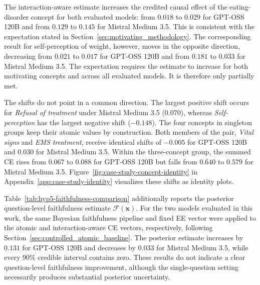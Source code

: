 The interaction-aware estimate increases the credited causal effect of the eating-disorder concept for both evaluated models: from $0.018$ to $0.029$ for GPT-OSS 120B and from $0.129$ to $0.145$ for Mistral Medium 3.5. This is consistent with the expectation stated in Section~\ref{sec:motivating_methodology}. The corresponding result for self-perception of weight, however, moves in the opposite direction, decreasing from $0.021$ to $0.017$ for GPT-OSS 120B and from $0.181$ to $0.033$ for Mistral Medium 3.5. The expectation requires the estimate to increase for both motivating concepts and across all evaluated models. It is therefore only partially met.


The shifts do not point in a common direction. The largest positive shift occurs for \textit{Refusal of treatment} under Mistral Medium 3.5 ($0.070$), whereas \textit{Self-perception} has the largest negative shift ($-0.148$). The four concepts in singleton groups keep their atomic values by construction. Both members of the pair, \textit{Vital signs} and \textit{EMS treatment}, receive identical shifts of $-0.005$ for GPT-OSS 120B and $0.030$ for Mistral Medium 3.5. Within the three-concept group, the summed CE rises from $0.067$ to $0.088$ for GPT-OSS 120B but falls from $0.640$ to $0.579$ for Mistral Medium 3.5. Figure~\ref{fig:case-study-concept-identity} in Appendix~\ref{app:case-study-identity} visualizes these shifts as identity plots.

Table~\ref{tab:hyp5-faithfulness-comparison} additionally reports the posterior question-level faithfulness estimate $\mathcal{F}(\mathbf{x})$. For the two models evaluated in this work, the same Bayesian faithfulness pipeline and fixed EE vector were applied to the atomic and interaction-aware CE vectors, respectively, following Section~\ref{sec:controlled_atomic_baseline}. The posterior estimate increases by $0.131$ for GPT-OSS 120B and decreases by $0.033$ for Mistral Medium 3.5, while every 90\% credible interval contains zero. These results do not indicate a clear question-level faithfulness improvement, although the single-question setting necessarily produces substantial posterior uncertainty.

